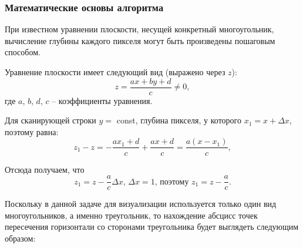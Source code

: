 \subsubsection*{Математические основы алгоритма}
При известном уравнении плоскости, несущей конкретный многоугольник,
вычисление глубины каждого пикселя могут быть произведены пошаговым
способом.
\par Уравнение плоскости имеет следующий вид (выражено через $z$):
\begin{equation}
		z = \frac{
		ax + by + d
  		}{
  		c
		}
 		\neq 0,
\end{equation}
где $a$, $b$, $d$, $c$ -- коэффициенты уравнения.
\par Для сканирующей строки \begin{math} y =\end{math} const, глубина пикселя, у которого \begin{math} x_1 = x + \Delta x\end{math}, поэтому равна:
\begin{equation}
		z_1 - z = - \frac{
		ax_1 +d
  		}{
  		c
		}
 		+  \frac{
		ax +d
  		}{
  		c
		} = 
 		\frac{
		a(x - x_1)
  		}{
  		c
		},
\end{equation}
\par Отсюда получаем, что
\begin{equation}
		z_1 = z - \frac{
		a
  		}{
  		c
		}\Delta x
	\text{, } 
		\Delta x = 1
	\text{, поэтому } 
		z_1 = z - \frac{
		a
  		}{
  		c
		}.
\end{equation}
\par Поскольку в данной задаче для визуализации используется только один вид
многоугольников, а именно треугольник, то нахождение абсцисс точек
пересечения горизонтали со сторонами треугольника будет выглядеть
следующим образом:
